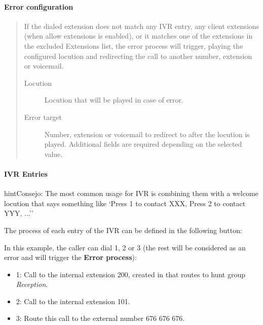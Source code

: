 \documentclass[letterpaper,10pt,spanish]{sphinxmanual}
\begin{document}
\paragraph{Error configuration}
\label{administration_portal/client/vpbx/routing_endpoints/ivrs:error-configuration}\begin{quote}

If the dialed extension does not match any IVR entry, any client extensions
(when allow extensions is enabled), or it matches one of the extensions in the
excluded Extensions list, the error process will trigger, playing the configured
locution and redirecting the call to another number, extension or voicemail.
\begin{description}
\item[{Locution}] \leavevmode
Locution that will be played in case of error.

\item[{Error target}] \leavevmode
Number, extension or voicemail to redirect to after the locution is played.
Additional fields are required depending on the selected value.

\end{description}
\end{quote}


\paragraph{IVR Entries}
\label{administration_portal/client/vpbx/routing_endpoints/ivrs:ivr-entries}
\begin{notice}{hint}{Consejo:}
The most common usage for IVR is combining them with a welcome
locution that says something like `Press 1 to contact XXX, Press 2 to
contact YYY, ...''
\end{notice}

The process of each entry of the IVR can be defined in the following button:

In this example, the caller can dial 1, 2 or 3 (the rest will be considered as
an error and will trigger the \textbf{Error process}):
\begin{itemize}
\item {} 
1: Call to the internal extension 200, created in {\hyperref[administration_portal/client/vpbx/routing_endpoints/hunt_groups:huntgroups]{}} that routes to hunt group \emph{Reception}.

\item {} 
2: Call to the internal extension 101.

\item {} 
3: Route this call to the external number 676 676 676.

\end{itemize}
\end{document}
